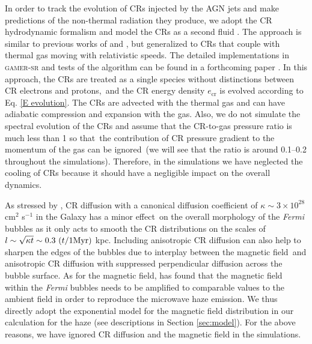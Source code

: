 \documentclass[fleqn,usenatbib,useAMS]{mnras}
\begin{document}
  In order to track the evolution of CRs injected by the AGN jets and make predictions of the non-thermal radiation they produce, we adopt the CR hydrodynamic formalism and model the CRs as a second fluid \citep{Zweibel2013}. The approach is similar to previous works of \cite{Guo2012} and \cite{Yang2012}, but generalized to CRs that couple with thermal gas moving with relativistic speeds. The detailed implementations in \textsc{gamer-sr} and tests of the algorithm can be found in a forthcoming paper \citep[][in prep.]{Chen2022}. In this approach, the CRs are treated as a single species without distinctions between CR electrons and protons,\
  and the CR energy density $e_{\text{cr}}$ is evolved according to Eq. \ref{E evolution}.
  The CRs are advected with the thermal gas and can have adiabatic compression and expansion with the gas. Also, we do not simulate the spectral evolution of the CRs and assume that the CR-to-gas pressure ratio is much less than 1 so that\
  the contribution of CR pressure gradient to the momentum of the gas can be ignored\
  (we will see that the ratio is around 0.1--0.2 throughout the simulations). %
Therefore, in the simulations we have neglected the cooling of CRs because it should have a negligible impact on the overall dynamics.

  As stressed by \citet{Yang2012}, CR diffusion with a canonical diffusion coefficient of $\kappa \sim 3\times 10^{28}$ cm$^2$ s$^{-1}$ in the Galaxy has a minor effect\
  on the overall morphology of the \textit{Fermi} bubbles as it
  only acts to smooth the CR distributions on the scales of $l \sim \sqrt{\kappa t} \sim 0.3\ (t/1 {\rm Myr})$ kpc. Including anisotropic CR diffusion can also help to sharpen the edges of the bubbles due to interplay between the magnetic field\
  and anisotropic CR diffusion with suppressed perpendicular diffusion across the bubble surface. As for the magnetic field, \cite{Yang2013} has found that the magnetic field within the \textit{Fermi} bubbles needs to be amplified to comparable values to the ambient field in order to reproduce the microwave haze emission. We thus directly adopt the exponential model for the magnetic field distribution in our calculation for the haze (see descriptions in Section \ref{sec:model}).
   For the above reasons, we have ignored CR diffusion and the magnetic field in the simulations.\
\end{document}
